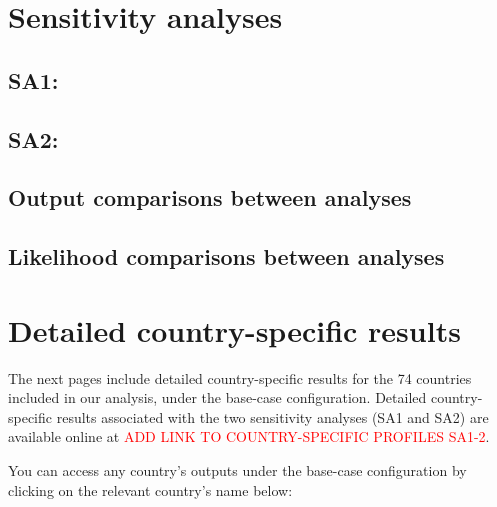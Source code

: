 \section{Sensitivity analyses}
\subsection{SA1: }
\subsection{SA2: }

\subsection{Output comparisons between analyses}

\subsection{Likelihood comparisons between analyses}


\section{Detailed country-specific results}

The next pages include detailed country-specific results for the 74 countries included in 
our analysis, under the base-case configuration. Detailed country-specific results associated
with the two sensitivity analyses (SA1 and SA2) are available online at \textcolor{red}{ADD LINK TO COUNTRY-SPECIFIC PROFILES SA1-2}.

You can access any country's outputs under the base-case configuration by clicking on the relevant country's name below:\\

\def\countrynames{{"", "Argentina", "Australia", "Austria", "Belgium", "Bangladesh", "Bulgaria", "Bosnia and Herzegovina", "Bolivia", "Brazil", "Canada", "Chile", "Colombia", "Costa Rica", "Czechia", "Germany", "Denmark", "Ecuador", "Egypt", "Spain", "Finland", "France", "United Kingdom", "Georgia", "Greece", "Guatemala", "Honduras", "Croatia", "Hungary", "Indonesia", "India", "Ireland", "Iraq", "Israel", "Italy", "Jordan", "Japan", "Kazakhstan", "Kenya", "Korea, Republic of", "Lebanon", "Sri Lanka", "Lithuania", "Latvia", "Morocco", "Moldova, Republic of", "Mexico", "North Macedonia", "Myanmar", "Malaysia", "Netherlands", "Nepal", "Pakistan", "Panama", "Peru", "Philippines", "Poland", "Portugal", "Paraguay", "Romania", "Russian Federation", "Saudi Arabia", "Serbia", "Slovakia", "Slovenia", "Sweden", "Thailand", "Turkey", "Ukraine", "Uruguay", "United States", "Venezuela", "Viet Nam", "South Africa", "Zimbabwe"}}%

